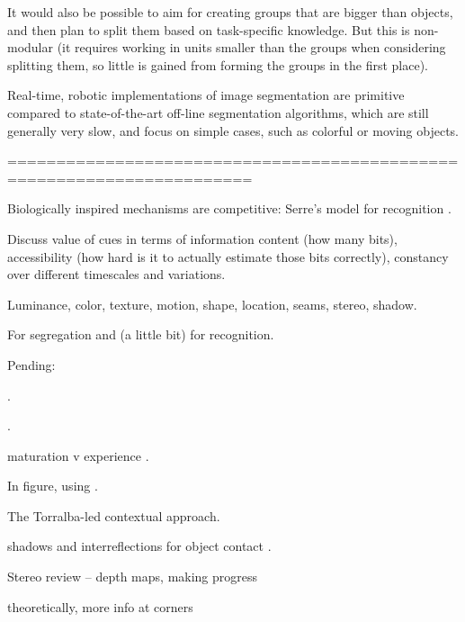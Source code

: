 %
\ifverbose
It would also be possible to
aim for creating groups that are bigger than objects, and then
plan to split them based on task-specific knowledge.
But this is  non-modular 
(it requires working in units smaller than the groups when considering 
splitting them, so little is gained from forming the groups in
the first place).
\fi

%
\ifverbose
%
Real-time, robotic
implementations of image segmentation are primitive compared to
state-of-the-art off-line segmentation algorithms, which are
still generally very slow, and focus on simple
cases, such as colorful or moving objects.
%
\fi


=======================================================================

Biologically inspired mechanisms are competitive:
Serre's model for recognition \cite{serre05object}.


Discuss value of cues in terms of information content (how many bits),
accessibility (how hard is it to actually estimate those bits
correctly), constancy over different timescales and variations.

Luminance, color, texture, motion, shape, location, seams, stereo,
shadow.

For segregation and (a little bit) for recognition.

Pending:

\cite{swain91color}.

\cite{schiele00recognition}.

\cite{lowe04distinctive}

\cite{felzenszwalb04efficient}

maturation v experience \cite{quinn05learning}.

In figure, using \cite{felzenszwalb04efficient}.

\cite{gibson88exploratory}

\cite{spelke90principles}

\cite{martin01database}

The Torralba-led contextual approach.


shadows and interreflections for object contact
\cite{madison01use}.


Stereo review -- depth maps, making progress
\cite{scharstein02taxonomy}

theoretically, more info at corners \cite{feldman05information}

